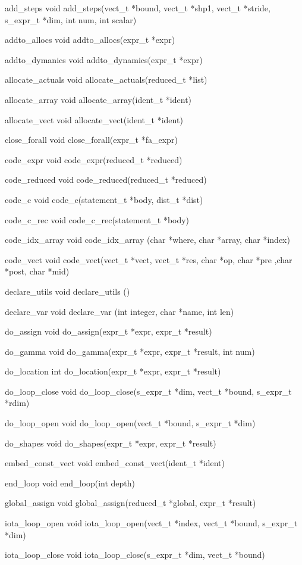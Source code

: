 add_steps
  void add_steps(vect_t *bound, vect_t *shp1, vect_t *stride, s_expr_t *dim,
    int num, int scalar)

addto_allocs
  void addto_allocs(expr_t *expr)

addto_dymanics
  void addto_dynamics(expr_t *expr)

allocate_actuals
  void allocate_actuals(reduced_t *list)

allocate_array
  void allocate_array(ident_t *ident)

allocate_vect
  void allocate_vect(ident_t *ident)

close_forall
  void close_forall(expr_t *fa_expr)

code_expr
  void code_expr(reduced_t *reduced)

code_reduced
  void code_reduced(reduced_t *reduced)

code_c
  void code_c(statement_t *body, dist_t *dist)

code_c_rec
  void code_c_rec(statement_t *body)

code_idx_array
  void code_idx_array (char *where, char *array, char *index)

code_vect
  void code_vect(vect_t *vect, vect_t *res, char *op, char *pre ,char *post,
          char *mid)

declare_utils
  void declare_utils ()

declare_var
  void declare_var (int integer, char *name, int len)

do_assign
  void do_assign(expr_t *expr, expr_t *result)

do_gamma
  void do_gamma(expr_t *expr, expr_t *result, int num)

do_location
  int do_location(expr_t *expr, expr_t *result)

do_loop_close
  void do_loop_close(s_expr_t *dim, vect_t *bound, s_expr_t *rdim)

do_loop_open
  void do_loop_open(vect_t *bound, s_expr_t *dim)

do_shapes
  void do_shapes(expr_t *expr, expr_t *result)

embed_const_vect
  void embed_const_vect(ident_t *ident)

end_loop
  void end_loop(int depth)

global_assign
  void global_assign(reduced_t *global, expr_t *result)

iota_loop_open
  void iota_loop_open(vect_t *index, vect_t *bound, s_expr_t *dim)

iota_loop_close
  void iota_loop_close(s_expr_t *dim, vect_t *bound)

